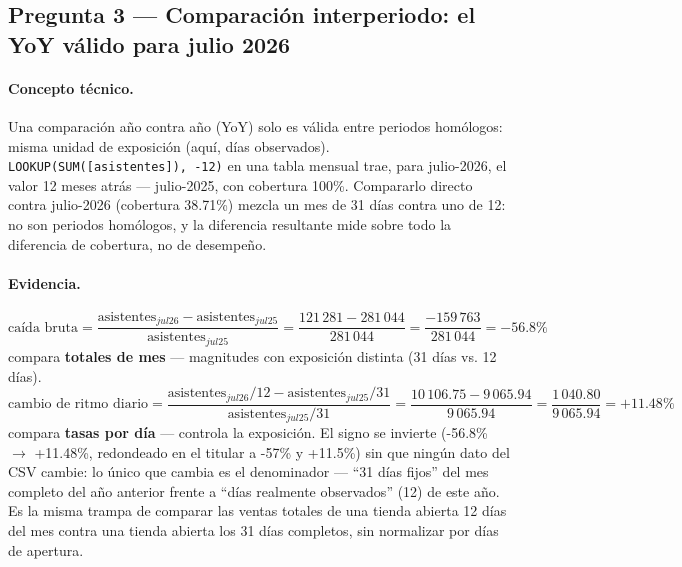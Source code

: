 \subsection{Pregunta 3 --- Comparación interperiodo: el YoY válido para julio 2026}
\label{ssec:c3-q3}

\paragraph{Concepto técnico.}
Una comparación año contra año (YoY) solo es válida entre periodos homólogos: misma unidad de exposición (aquí, días observados). \texttt{LOOKUP(SUM([asistentes]), -12)} en una tabla mensual trae, para julio-2026, el valor 12 meses atrás --- julio-2025, con cobertura 100\%. Compararlo directo contra julio-2026 (cobertura 38.71\%) mezcla un mes de 31 días contra uno de 12: no son periodos homólogos, y la diferencia resultante mide sobre todo la diferencia de cobertura, no de desempeño.

\paragraph{Evidencia.}
\[
\text{caída bruta} = \frac{\text{asistentes}_{jul26} - \text{asistentes}_{jul25}}{\text{asistentes}_{jul25}} = \frac{121\,281 - 281\,044}{281\,044} = \frac{-159\,763}{281\,044} = -56.8\%
\]
compara \textbf{totales de mes} --- magnitudes con exposición distinta (31 días vs. 12 días).
\[
\text{cambio de ritmo diario} = \frac{\text{asistentes}_{jul26}/12 - \text{asistentes}_{jul25}/31}{\text{asistentes}_{jul25}/31} = \frac{10\,106.75 - 9\,065.94}{9\,065.94} = \frac{1\,040.80}{9\,065.94} = +11.48\%
\]
compara \textbf{tasas por día} --- controla la exposición. El signo se invierte (-56.8\% $\rightarrow$ +11.48\%, redondeado en el titular a -57\% y +11.5\%) sin que ningún dato del CSV cambie: lo único que cambia es el denominador --- \enquote{31 días fijos} del mes completo del año anterior frente a \enquote{días realmente observados} (12) de este año. Es la misma trampa de comparar las ventas totales de una tienda abierta 12 días del mes contra una tienda abierta los 31 días completos, sin normalizar por días de apertura.

